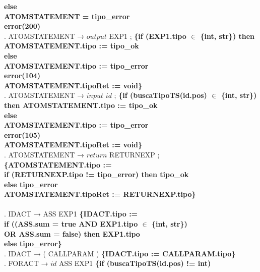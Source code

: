 \begin{tabbing}
    \> \> \> \textbf{else}\\
    \> \> \> \> \textbf{ATOMSTATEMENT = tipo\_error}\\
    \> \> \> \> \textbf{error(200)}\\
    . ATOMSTATEMENT → $output$ EXP1 ; \textbf{\{if (EXP1.tipo $\in$ \{int, str\}) then}\\
    \>                    \> \> \> \textbf{ATOMSTATEMENT.tipo := tipo\_ok}\\
    \>                    \> \>\textbf{else} \\
    \> \> \> \textbf{ATOMSTATEMENT.tipo := tipo\_error}\\
    \> \> \> \textbf{error(104)}\\
    \>                    \> \textbf{ATOMSTATEMENT.tipoRet := void\}}\\
    . ATOMSTATEMENT → $input$ $id$ ; \textbf{\{if (buscaTipoTS(id.pos) $\in$ \{int, str\})}\\
    \>                    \> \>\textbf{then ATOMSTATEMENT.tipo := tipo\_ok}\\
    \>                    \> \textbf{else} \\
    \> \> \> \textbf{ATOMSTATEMENT.tipo := tipo\_error}\\
    \> \> \> \textbf{error(105)}\\
    \>                    \> \textbf{ATOMSTATEMENT.tipoRet := void\}}\\
    . ATOMSTATEMENT → $return$ RETURNEXP ; \textbf{\{ATOMSTATEMENT.tipo :=}\\
    \>                    \> \textbf{if (RETURNEXP.tipo != tipo\_error) then tipo\_ok}\\
    \>                    \> \textbf{else tipo\_error}\\
    \>                    \> \textbf{ATOMSTATEMENT.tipoRet := RETURNEXP.tipo\}}\\
    \\
    . IDACT → ASS EXP1 \textbf{\{IDACT.tipo :=}\\
    \>                    \> \textbf{if ((ASS.sum = true AND EXP1.tipo $\in$ \{int, str\})}\\
    \>                    \> \>\textbf{OR ASS.sum = false) then EXP1.tipo}\\
    \>                    \> \textbf{else tipo\_error\}}\\
    . IDACT → ( CALLPARAM ) \textbf{\{IDACT.tipo := CALLPARAM.tipo\}}\\
    . FORACT → $id$ ASS EXP1 \textbf{\{if (buscaTipoTS(id.pos) != int)}\\

\end{tabbing}
